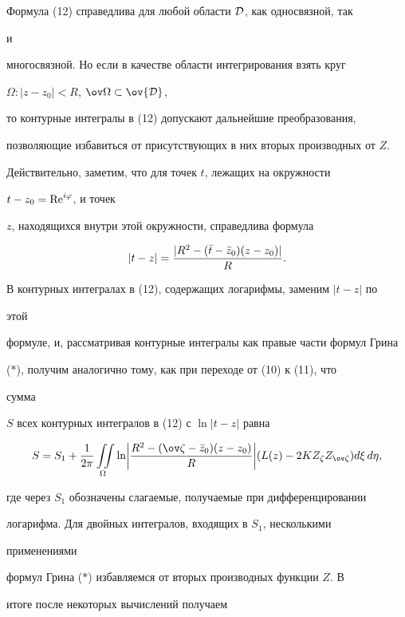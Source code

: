 Формула (12) справедлива для любой области $\cal D$, как односвязной, так 


и 


многосвязной. Но если в качестве области интегрирования взять круг 


$\Omega:|z-z_0|<R$, $\ov\Omega\subset\ov{\cal D}$, 


то контурные интегралы в (12) допускают дальнейшие преобразования, 


позволяющие избавиться от присутствующих в них вторых производных от $Z$. 


 


Действительно, заметим, что для точек $t$, лежащих на окружности 


$t-z_0=\operatorname{Re}^{i\varphi}$, и точек 


$z$, находящихся внутри этой окружности, справедлива формула 


$$ 


|t-z|=\frac{|R^2-(\Bar t-\Bar z_0)(z-z_0)|}{R}. 


$$ 


В контурных интегралах в (12), содержащих логарифмы, заменим $|t-z|$ по 


этой 


формуле, и, рассматривая контурные интегралы как правые части формул Грина 


($\ast$), получим аналогично тому, как при переходе от (10) к (11), что 


сумма 


$S$ всех контурных интегралов в (12) с $\ln|t-z|$ равна 


\begin{equation} 


S=S_1+\frac{1}{2\pi}\iintl_\Omega\ln\biggl| 


\frac{R^2-(\ov\zeta-\Bar z_0)(z-z_0)}{R}\biggr| 


(L(z)-2KZ_\zeta Z_{\ov\zeta})d\xi\,d\eta, 


\end{equation} 


где через $S_1$ обозначены слагаемые, получаемые при дифференцировании 


логарифма. Для двойных интегралов, входящих в $S_1$, несколькими 


применениями 


формул Грина ($\ast$) избавляемся от вторых производных функции $Z$. В 


итоге после некоторых вычислений получаем 


